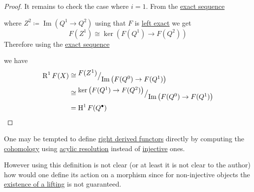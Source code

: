 \documentclass[../../main]{subfiles}
\begin{document}
\begin{proof}
  It remains to check the case where \(i = 1\).
  From the \hyperref[def:exact-sequence]{exact sequence}
  \begin{center}
  \end{center}
  where \(Z^{2} \coloneq \operatorname{Im} \left( Q^{1} \to Q^{2} \right)\) using that \(F\) is \hyperref[def:exact-functor]{left exact} we get
  \begin{equation*}
    F(Z^{1}) \cong \ker \left( F(Q^{1}) \to F(Q^{2}) \right)
  \end{equation*}
  Therefore using the \hyperref[def:exact-sequence]{exact sequence}
  \begin{center}
  \end{center}
  we have
  \begin{align*}
    \operatorname{R}^{1}F(X) &\cong {^{\textstyle F(Z^{1})}\big/_{\textstyle \operatorname{Im} \left( F(Q^{0}) \to F(Q^{1}) \right)}} \\
                             &\cong {^{\textstyle \ker \left( F(Q^{1}) \to F(Q^{2}) \right)}\big/_{\textstyle \operatorname{Im} \left( F(Q^{0}) \to F(Q^{1}) \right)}} \\
                             &= \operatorname{H}^{1}F(Q^{\bullet}) \qedhere
  \end{align*}
\end{proof}

\begin{remark}
  One may be tempted to define \hyperref[def:right-derived-functor]{right derived functors} directly by computing the \hyperref[def:cohomology]{cohomology} using \hyperref[def:resolution]{acylic resolution} instead of \hyperref[def:injective-projective-object]{injective} ones.

  However using this definition is not clear (or at least it is not clear to the author) how would one define its action on a morphism since for non-injective objects the \hyperref[thm:existence-of-lifting]{existence of a lifting} is not guaranteed.
\end{remark}
\end{document}
